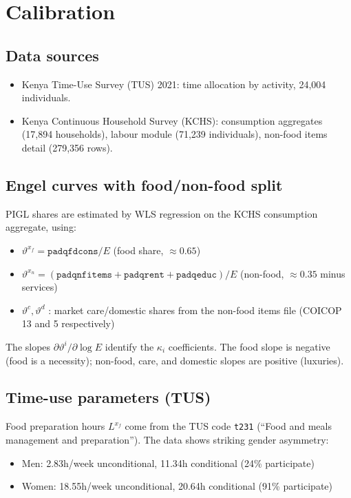 \documentclass[11pt,a4paper]{article}
\begin{document}
\section{Calibration}

\subsection{Data sources}

\begin{itemize}[noitemsep]
  \item Kenya Time-Use Survey (TUS) 2021: time allocation by activity,
    24{,}004 individuals.
  \item Kenya Continuous Household Survey (KCHS): consumption aggregates
    (17{,}894 households), labour module (71{,}239 individuals),
    non-food items detail (279{,}356 rows).
\end{itemize}

\subsection{Engel curves with food/non-food split}

PIGL shares are estimated by WLS regression on the KCHS consumption
aggregate, using:
\begin{itemize}[noitemsep]
  \item $\vartheta^{x_f} = \texttt{padqfdcons} / E$ (food share, $\approx 0.65$)
  \item $\vartheta^{x_n} = (\texttt{padqnfitems} + \texttt{padqrent}
    + \texttt{padqeduc}) / E$ (non-food, $\approx 0.35$ minus services)
  \item $\vartheta^c, \vartheta^d$ : market care/domestic shares from
    the non-food items file (COICOP 13 and 5 respectively)
\end{itemize}

The slopes $\partial \vartheta^i / \partial \log E$ identify the
$\kappa_i$ coefficients. The food slope is negative (food is a
necessity); non-food, care, and domestic slopes are positive (luxuries).

\subsection{Time-use parameters (TUS)}

Food preparation hours $L^{x_f}$ come from the TUS code \texttt{t231}
(``Food and meals management and preparation''). The data shows striking
gender asymmetry:
\begin{itemize}[noitemsep]
  \item Men: 2.83h/week unconditional, 11.34h conditional (24\% participate)
  \item Women: 18.55h/week unconditional, 20.64h conditional (91\% participate)
\end{itemize}
\end{document}
